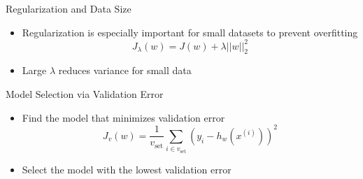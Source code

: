 \documentclass[serif, aspectratio=169]{beamer}
\begin{document}
\begin{frame}{Regularization and Data Size}
  \begin{itemize}
    \item Regularization is especially important for small datasets to prevent overfitting
    \[
    J_{\lambda}(w) = J(w) + \lambda ||w||_2^2
    \]
    \item Large \( \lambda \) reduces variance for small data
  \end{itemize}
\end{frame}

\begin{frame}{Model Selection via Validation Error}
  \begin{itemize}
    \item Find the model that minimizes validation error
    \[
    J_v(w) = \frac{1}{v_{\text{set}}} \sum_{i \in v_{\text{set}}} (y_i - h_w(x^{(i)}))^2
    \]
    \item Select the model with the lowest validation error
  \end{itemize}
\end{frame}
\end{document}
